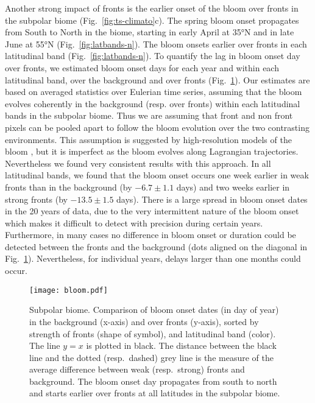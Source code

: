 Another strong impact of fronts is the earlier onset of the bloom over fronts in the subpolar biome (Fig.~\ref{fig:ts-climato}c).
The spring bloom onset propagates from South to North in the biome, starting in early April at 35°N and in late June at 55°N (Fig.~\ref{fig:latbands-n}).
The bloom onsets earlier over fronts in each latitudinal band (Fig.~\ref{fig:latbands-n}).
To quantify the lag in bloom onset day over fronts, we estimated bloom onset days for each year and within each latitudinal band, over the background and over fronts (Fig.~\ref{fig:bloom}).
Our estimates are based on averaged statistics over Eulerian time series, assuming that the bloom evolves coherently in the background (resp.
over fronts) within each latitudinal bands in the subpolar biome.
Thus we are assuming that front and non front pixels can be pooled apart to follow the bloom evolution over the two contrasting environments.
This assumption is suggested by high-resolution models of the bloom \parencite[e.g.][]{levy_2005a, karleskind_2011}, but it is imperfect as the bloom evolves along Lagrangian trajectories.
Nevertheless we found very consistent results with this approach.
In all latitudinal bands, we found that the bloom onset occurs one week earlier in weak fronts than in the background (by \( -6.7 \pm 1.1 \) days) and two weeks earlier in strong fronts (by \( -13.5 \pm 1.5 \) days).
There is a large spread in bloom onset dates in the 20 years of data, due to the very intermittent nature of the bloom onset \parencite{keerthi_2021} which makes it difficult to detect with precision during certain years.
Furthermore, in many cases no difference in bloom onset or duration could be detected between the fronts and the background (dots aligned on the diagonal in Fig.~\ref{fig:bloom}).
Nevertheless, for individual years, delays larger than one months could occur.

\begin{figure}
  \texttt{[image: bloom.pdf]}
  \caption{
    Subpolar biome. Comparison of bloom onset dates (in day of year) in the background (x-axis) and over fronts (y-axis), sorted by strength of fronts (shape of symbol), and latitudinal band (color).
    The line \(y=x\) is plotted in black.
    The distance between the black line and the dotted (resp.\ dashed) grey line is the measure of the average difference between weak (resp.\ strong) fronts and background.
    The bloom onset day propagates from south to north and starts earlier over fronts at all latitudes in the subpolar biome.
  }%
  \label{fig:bloom}
\end{figure}


